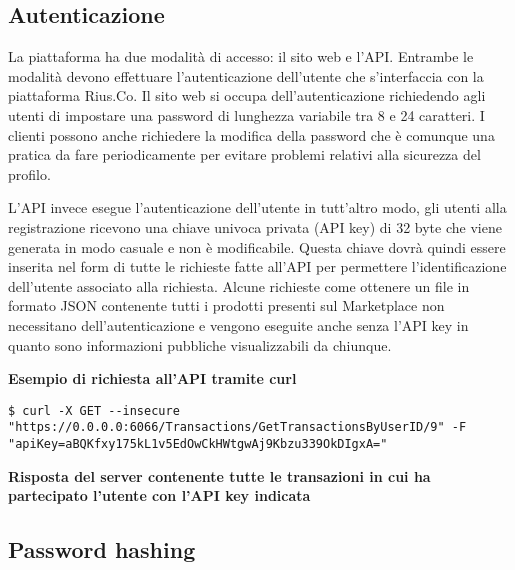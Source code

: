 \subsection{Autenticazione}
La piattaforma ha due modalità di accesso: il sito web e l'API. Entrambe le modalità devono effettuare l'autenticazione dell'utente che s'interfaccia con la piattaforma Rius.Co. Il sito web si occupa dell'autenticazione richiedendo agli utenti di impostare una password di lunghezza variabile tra 8 e 24 caratteri. I clienti possono anche richiedere la modifica della password che è comunque una pratica da fare periodicamente per evitare problemi relativi alla sicurezza del profilo. 
\medskip

L'API invece esegue l'autenticazione dell'utente in tutt'altro modo, gli utenti alla registrazione ricevono una chiave univoca privata (API key) di 32 byte che viene generata in modo casuale e non è modificabile. Questa chiave dovrà quindi essere inserita nel form di tutte le richieste fatte all'API per permettere l'identificazione dell'utente associato alla richiesta. Alcune richieste come ottenere un file in formato JSON contenente tutti i prodotti presenti sul Marketplace non necessitano dell'autenticazione e vengono eseguite anche senza l'API key in quanto sono informazioni pubbliche visualizzabili da chiunque. 
\bigskip

\textbf{Esempio di richiesta all'API tramite curl}
\begin{lstlisting}[style=dos]
$ curl -X GET --insecure "https://0.0.0.0:6066/Transactions/GetTransactionsByUserID/9" -F  "apiKey=aBQKfxy175kL1v5EdOwCkHWtgwAj9Kbzu339OkDIgxA="
\end{lstlisting}
\bigskip

\textbf{Risposta del server contenente tutte le transazioni in cui ha partecipato l'utente con l'API key indicata} 

\subsection{Password hashing} 
